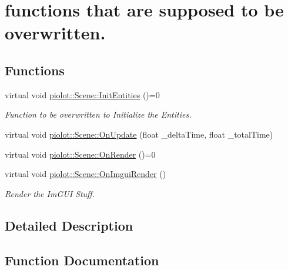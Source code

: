 \hypertarget{group___virtual}{}\section{functions that are supposed to be overwritten.}
\label{group___virtual}
\subsection*{Functions}
\begin{DoxyCompactItemize}
\item 
virtual void \mbox{\hyperlink{group___virtual_ga6871dbb3f61a724a166fd83c3c1dc3a3}{piolot\+::\+Scene\+::\+Init\+Entities}} ()=0
\begin{DoxyCompactList}\small\item\em Function to be overwritten to Initialize the Entities. \end{DoxyCompactList}\item 
virtual void \mbox{\hyperlink{group___virtual_gae05b812e9f1caa80526a79a03ab456e1}{piolot\+::\+Scene\+::\+On\+Update}} (float \+\_\+delta\+Time, float \+\_\+total\+Time)
\item 
virtual void \mbox{\hyperlink{group___virtual_gaaa3f6f2cb0dce355d890c8b43a2f11f2}{piolot\+::\+Scene\+::\+On\+Render}} ()=0
\item 
virtual void \mbox{\hyperlink{group___virtual_gaedea470f1c3485d76ef0681e4a503584}{piolot\+::\+Scene\+::\+On\+Imgui\+Render}} ()
\begin{DoxyCompactList}\small\item\em Render the Im\+G\+UI Stuff. \end{DoxyCompactList}\end{DoxyCompactItemize}


\subsection{Detailed Description}


\subsection{Function Documentation}
\mbox{\label{group___virtual_ga6871dbb3f61a724a166fd83c3c1dc3a3}} 
